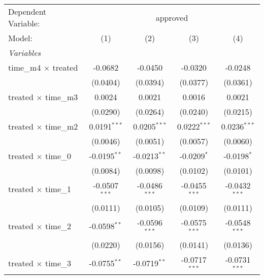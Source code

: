 \begingroup
\centering
\begin{tabular}{lcccc}
   \tabularnewline \midrule \midrule
   Dependent Variable: & \multicolumn{4}{c}{approved}\\
   Model:                                              & (1)             & (2)             & (3)             & (4)\\  
   \midrule
   \emph{Variables}\\
   time\_m4 $\times$ treated                           & -0.0682         & -0.0450         & -0.0320         & -0.0248\\   
                                                       & (0.0404)        & (0.0394)        & (0.0377)        & (0.0361)\\   
   treated $\times$ time\_m3                           & 0.0024          & 0.0021          & 0.0016          & 0.0021\\   
                                                       & (0.0290)        & (0.0264)        & (0.0240)        & (0.0215)\\   
   treated $\times$ time\_m2                           & 0.0191$^{***}$  & 0.0205$^{***}$  & 0.0222$^{***}$  & 0.0236$^{***}$\\   
                                                       & (0.0046)        & (0.0051)        & (0.0057)        & (0.0060)\\   
   treated $\times$ time\_0                            & -0.0195$^{**}$  & -0.0213$^{**}$  & -0.0209$^{*}$   & -0.0198$^{*}$\\   
                                                       & (0.0084)        & (0.0098)        & (0.0102)        & (0.0101)\\   
   treated $\times$ time\_1                            & -0.0507$^{***}$ & -0.0486$^{***}$ & -0.0455$^{***}$ & -0.0432$^{***}$\\   
                                                       & (0.0111)        & (0.0105)        & (0.0109)        & (0.0111)\\   
   treated $\times$ time\_2                            & -0.0598$^{**}$  & -0.0596$^{***}$ & -0.0575$^{***}$ & -0.0548$^{***}$\\   
                                                       & (0.0220)        & (0.0156)        & (0.0141)        & (0.0136)\\   
   treated $\times$ time\_3                            & -0.0755$^{**}$  & -0.0719$^{**}$  & -0.0717$^{***}$ & -0.0731$^{***}$\\   

\end{tabular}
